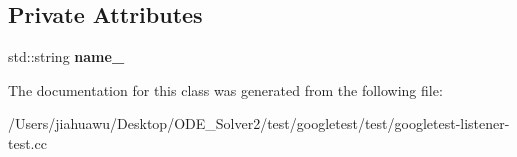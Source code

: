 \subsection*{Private Attributes}
\begin{DoxyCompactItemize}
\item 
\mbox{\label{classtesting_1_1internal_1_1_event_recording_listener_ad65961b8f32b63cffd46c8820256a88f}} 
std\+::string {\bfseries name\+\_\+}
\end{DoxyCompactItemize}


The documentation for this class was generated from the following file\+:\begin{DoxyCompactItemize}
\item 
/\+Users/jiahuawu/\+Desktop/\+O\+D\+E\+\_\+\+Solver2/test/googletest/test/googletest-\/listener-\/test.\+cc\end{DoxyCompactItemize}
